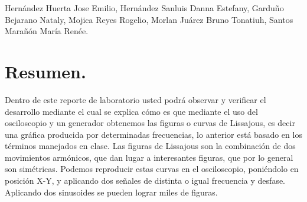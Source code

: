 \documentclass[10pt]{article}
\begin{document}
\tableofcontents
\newpage
\begin{center}
	Hernández Huerta Jose Emilio, 
	Hernández Sanluis Danna Estefany,  
	Garduño Bejarano Nataly,
	Mojica Reyes Rogelio,
	Morlan Juárez Bruno Tonatiuh,  
	Santos Marañón María Renée.
\end{center}

\section{Resumen.}
Dentro de este reporte de laboratorio usted podrá observar y verificar el desarrollo mediante el cual se explica cómo es que mediante el uso del osciloscopio y un generador obtenemos las figuras o curvas de Lissajous, es decir una gráfica producida por determinadas frecuencias, lo anterior está basado en los términos manejados en clase. Las figuras de Lissajous son la combinación de dos movimientos armónicos, que dan lugar a interesantes figuras, que por lo general son simétricas. Podemos reproducir estas curvas en el osciloscopio, poniéndolo en posición X-Y, y aplicando dos señales de distinta o igual frecuencia y desfase. Aplicando dos sinusoides se pueden lograr miles de figuras.
\end{document}
